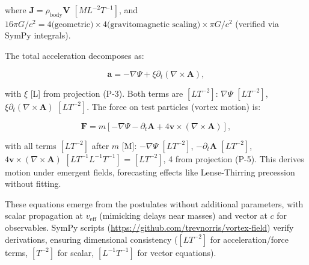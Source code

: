 where $\mathbf{J} = \rho_{\text{body}} \mathbf{V}$ $[M L^{-2} T^{-1}]$, and $16\pi G/c^2 = 4 \text{(geometric)} \times 4 \text{(gravitomagnetic scaling)} \times \pi G/c^2$ (verified via SymPy integrals).

The total acceleration decomposes as:

\begin{equation}
\mathbf{a} = -\nabla \Psi + \xi \partial_t (\nabla \times \mathbf{A}),
\end{equation}

with $\xi$ [L] from projection (P-3). Both terms are $[L T^{-2}]$: $\nabla \Psi$ $[L T^{-2}]$, $\xi \partial_t (\nabla \times \mathbf{A})$ $[L T^{-2}]$. The force on test particles (vortex motion) is:

\begin{equation}
\mathbf{F} = m \left[ -\nabla \Psi - \partial_t \mathbf{A} + 4 \mathbf{v} \times (\nabla \times \mathbf{A}) \right],
\end{equation}

with all terms $[L T^{-2}]$ after $m$ [M]: $-\nabla \Psi$ $[L T^{-2}]$, $-\partial_t \mathbf{A}$ $[L T^{-2}]$, $4 \mathbf{v} \times (\nabla \times \mathbf{A})$ $[L T^{-1} L^{-1} T^{-1}]$ = $[L T^{-2}]$, 4 from projection (P-5). This derives motion under emergent fields, forecasting effects like Lense-Thirring precession without fitting.

These equations emerge from the postulates without additional parameters, with scalar propagation at $v_{\text{eff}}$ (mimicking delays near masses) and vector at $c$ for observables. SymPy scripts (\url{https://github.com/trevnorris/vortex-field}) verify derivations, ensuring dimensional consistency ($[L T^{-2}]$ for acceleration/force terms, $[T^{-2}]$ for scalar, $[L^{-1} T^{-1}]$ for vector equations).

\medskip
\noindent
{}
\medskip

